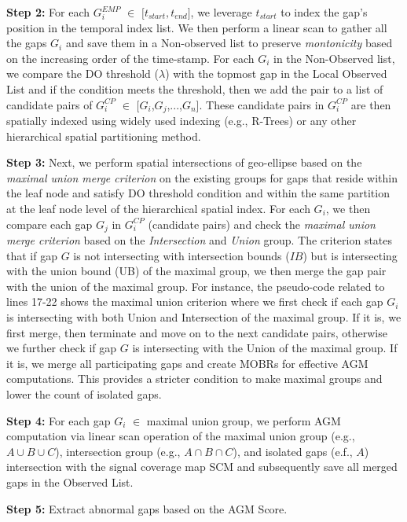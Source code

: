 \documentclass[acmsmall]{acmart}
\begin{document}
\textbf{Step 2:} For each  ${G_{i}^{EMP}}$ $\in$ $\lbrack t_{start},t_{end} \rbrack$, we leverage $t_{start}$ to index the gap's position in the temporal index list. We then perform a linear scan to gather all the gaps $G_{i}$ and save them in a Non-observed list to preserve \textit{montonicity} based on the increasing order of the time-stamp. For each $G_{i}$ in the Non-Observed list, we compare the DO threshold ($\lambda$) with the topmost gap in the Local Observed List and if the condition meets the threshold, then we add the pair to a list of candidate pairs of $G_{i}^{CP}$ $\in$ [$G_{i}$,$G_{j}$,...,$G_{n}$]. These candidate pairs in $G_{i}^{CP}$ are then spatially indexed using widely used indexing (e.g., R-Trees) or any other hierarchical spatial partitioning method.

\textbf{Step 3:} Next, we perform spatial intersections of geo-ellipse based on the \textit{maximal union merge criterion} on the existing groups for gaps that reside within the leaf node and satisfy DO threshold condition and within the same partition at the leaf node level of the hierarchical spatial index. For each $G_{i}$, we then compare each gap $G_{j}$ in $G_{i}^{CP}$ (candidate pairs) and check the \textit{maximal union merge criterion} based on the \textit{Intersection} and \textit{Union} group. The criterion states that if gap $G$ is not intersecting with intersection bounds ($IB$) but is intersecting with the union bound (UB) of the maximal group, we then merge the gap pair with the union of the maximal group. For instance, the pseudo-code related to lines 17-22 shows the maximal union criterion where we first check if each gap $G_{i}$ is intersecting with both Union and Intersection of the maximal group. If it is, we first merge, then terminate and move on to the next candidate pairs, otherwise we further check if gap $G$ is intersecting with the Union of the maximal group. If it is, we merge all participating gaps and create MOBRs for effective AGM computations. This provides a stricter condition to make maximal groups and lower the count of isolated gaps.

\textbf{Step 4:} For each gap $G_{i}$ $\in$ maximal union group, we perform AGM computation via linear scan operation of the maximal union group (e.g., $A \cup B \cup C$), intersection group (e.g., $A \cap B \cap C$), and isolated gaps (e.f., $A$) intersection with the signal coverage map SCM and subsequently save all merged gaps in the Observed List.

\textbf{Step 5:} Extract abnormal gaps based on the AGM Score.
\end{document}
